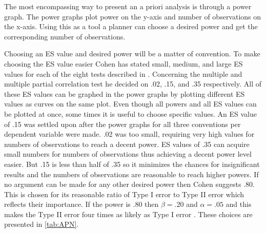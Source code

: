 The most encompassing way to present an a priori analysis is through a power graph.
The power graphs plot power on the y-axis and number of observations on the x-axis.
Using this as a tool a planner can choose a desired power and get the corresponding number of observations.

Choosing an ES value and desired power will be a matter of convention.
To make choosing the ES value easier Cohen has stated small, medium, and large ES values for each of the eight tests described in \citet{cohen1992power}.
Concerning the multiple and multiple partial correlation test he decided on .02, .15, and .35 respectively.
All of these ES values can be graphed in the power graphs by plotting different ES values as curves on the same plot.
Even though all powers and all ES values can be plotted at once, some times it is useful to choose specific values.
An ES value of .15 was settled upon after the power graphs for all three conventions per dependent variable were made.
.02 was too small, requiring very high values for numbers of observations to reach a decent power.
ES values of .35 can acquire small numbers for numbers of observations thus achieving a decent power level easier.
But .15 is less than half of .35 so it minimizes the chances for insignificant results and the numbers of observations are reasonable to reach higher powers.
If no argument can be made for any other desired power then Cohen suggests .80.
This is chosen for its reasonable ratio of Type I error to Type II error which reflects their importance.
If the power is .80 then $\beta=.20$ and $\alpha=.05$ and this makes the Type II error four times as likely as Type I error \citep{cohen1992statistical}.
These choices are presented in \autoref{tab:APN}.


